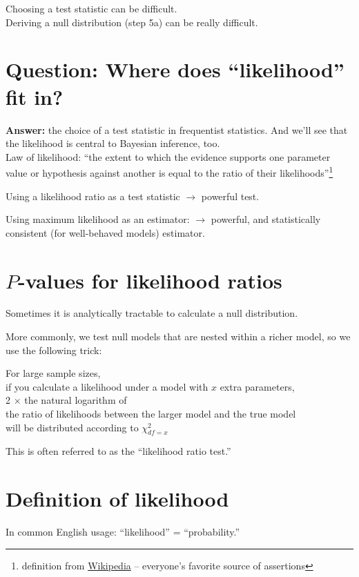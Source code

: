 \documentclass[landscape]{foils}
\begin{document}
Choosing a test statistic can be difficult.\\
Deriving a null distribution (step 5a) can be really difficult.
\myNewSlide
\section*{Question: Where does ``likelihood'' fit in?}
{\bf Answer:} the choice of a test statistic in frequentist statistics.
And we'll see that the likelihood is central to Bayesian inference, too.\\

Law of likelihood: ``the extent to which the evidence supports one parameter value or hypothesis against another is equal to the ratio of their likelihoods''\footnote{definition from \href{https://en.wikipedia.org/wiki/Likelihood_principle#The_law_of_likelihood}{Wikipedia} -- everyone's favorite source of assertions}

Using a likelihood ratio as a test statistic $\rightarrow$ powerful test.

Using maximum likelihood as an estimator: $\rightarrow$ powerful, and statistically consistent (for well-behaved models) estimator.

\myNewSlide
\section*{$P$-values for likelihood ratios}

Sometimes it is analytically tractable to calculate a null distribution.

More commonly, we test null models that are nested within a richer model,
so we use the following trick:

For large sample sizes,\\
if you calculate a likelihood under a model with $x$ extra parameters, \\
2 $\times$ the natural logarithm of\\
the ratio of likelihoods between the larger model and the true model \\
will
be distributed according to $\chi^2_{df=x}$

This is often referred to as the ``likelihood ratio test.''


\myNewSlide
\section*{Definition of likelihood}
In common English usage: ``likelihood'' = ``probability.''
\end{document}

